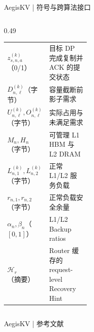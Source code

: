 \begin{frame}{AegisKV | 符号与跨算法接口}
\begin{columns}[T,onlytextwidth]
\begin{column}{0.49\textwidth}
\begin{tabularx}{\linewidth}{p{0.34\linewidth}X}
        $z_{s,n,a}^{(k)}$（0/1） & 目标 DP 完成复制并 ACK 的提交状态 \\
        $D_{n,\ell}^{(k)}$（字节） & 容量截断前影子需求 \\
        $U_{n,\ell}^{(k)},O_{n,\ell}^{(k)}$（字节） & 实际占用与未满足需求 \\
        $M_n,H_n$（字节） & 可管理 L1 HBM 与 L2 DRAM \\
        $L_{n,1}^{(k)},L_{n,2}^{(k)}$（字节） & 正常 L1/L2 服务负载 \\
        $r_{n,1},r_{n,2}$（字节） & 正常负载安全余量 \\
        $\alpha_n,\beta_n$（$[0,1]$） & L1/L2 Backup ratios \\
        $\mathcal H_r$（摘要） & Router 缓存的 request-level Recovery Hint \\
        \bottomrule
      \end{tabularx}
    \end{column}
  \end{columns}

  \vspace{0.10cm}
\end{frame}

\begin{frame}[allowframebreaks]{AegisKV | 参考文献}
  \scriptsize
  
  
\end{frame}
